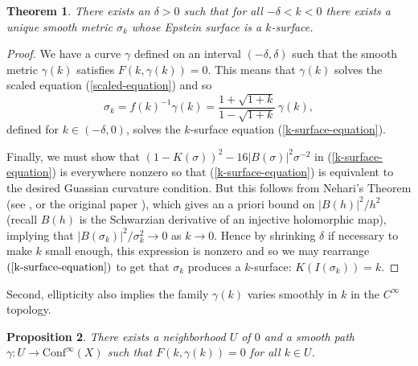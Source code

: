 \documentclass{amsart}
\newtheorem{thm}{Theorem}[section]
\newtheorem{prop}[thm]{Proposition}
\begin{document}
\begin{thm}
\label{k-surfaces-existence}
There exists an $\delta > 0$ such that for all $-\delta < k < 0$ there exists a unique smooth metric $\sigma_k$ whose Epstein surface is a $k$-surface.
\end{thm}

\begin{proof}
We have a curve $\gamma$ defined on an interval $(-\delta, \delta)$ such that the smooth metric $\gamma(k)$ satisfies $F(k,\gamma(k)) = 0$. 
This means that $\gamma(k)$ solves the scaled equation (\ref{scaled-equation}) and so 
\[
\sigma_k = f(k)^{-1} \gamma(k) =  \frac{1 + \sqrt{1+k}}{1 - \sqrt{1+k}} \, \gamma(k),
\]
defined for $k \in (-\delta,0)$, solves the $k$-surface equation (\ref{k-surface-equation}). 

Finally, we must show that $(1-K(\sigma))^2 - 16|B(\sigma)|^2\sigma^{-2}$ in (\ref{k-surface-equation}) is everywhere nonzero so that (\ref{k-surface-equation}) is equivalent to the desired Guassian curvature condition.
But this follows from Nehari's Theorem (see \cite[Theorem 1.3]{lehto-1987}, or the original paper \cite{nehari-1949}), which gives an a priori bound on $|B(h)|^2/h^2$ (recall $B(h)$ is the Schwarzian derivative of an injective holomorphic map), implying that $|B(\sigma_k)|^2/\sigma_k^2 \to 0$ as $k \to 0$. 
Hence by shrinking $\delta$ if necessary to make $k$ small enough, this expression is nonzero and so we may rearrange $(\ref{k-surface-equation})$ to get that $\sigma_k$ produces a $k$-surface: $K(I(\sigma_k)) = k$.
\end{proof}

Second, ellipticity also implies the family $\gamma(k)$ varies smoothly in $k$ in the $C^\infty$ topology. 

\begin{prop}
There exists a neighborhood $U$ of $0$ and a smooth path $\gamma: U \to \mathrm{Conf}^\infty(X)$ such that $F(k,\gamma(k)) = 0$ for all $k \in U$. 
\end{prop}
\end{document}
